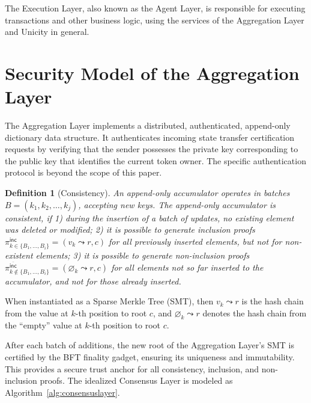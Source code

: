 \documentclass[twocolumn]{article}
\newtheorem{definition}{Definition}
\begin{document}
The Execution Layer, also known as the Agent Layer, is responsible for executing transactions and other business logic, using the services of the Aggregation Layer and Unicity in general.


\section{Security Model of the Aggregation Layer}

The Aggregation Layer implements a distributed, authenticated, append-only dictionary data structure.
It authenticates incoming state transfer certification requests by verifying that the sender possesses the private key corresponding to the public key that identifies the current token owner. The specific authentication protocol is beyond the scope of this paper.

\begin{definition}[Consistency]
An append-only accumulator operates in batches $B = (k_1, k_2, \ldots, k_j)$, accepting new keys. The append-only accumulator is \emph{consistent}, if 1) during the insertion of a batch of updates, no existing element was deleted or modified; 2) it is possible to generate inclusion proofs $\pi^{\textsf{inc}}_{k \in \{B_1, \dots, B_i\}} = (v_k \leadsto r, c)$ for all previously inserted elements, but not for non-existent elements; 3) it is possible to generate non-inclusion proofs $\pi^{\overline{\textsf {inc}}}_{k \notin \{B_1, \dots, B_i\}} = (\varnothing_k \leadsto r, c)$ for all elements not so far inserted to the accumulator, and not for those already inserted.
\label{def:append-only-accumulator}
\end{definition}

When instantiated as a Sparse Merkle Tree (SMT), then $v_k \leadsto r$ is the hash chain from the value at $k$-th position to root $c$, and $\varnothing_k \leadsto r$ denotes the hash chain from the ``empty'' value at $k$-th position to root $c$.

After each batch of additions, the new root of the Aggregation Layer's SMT is certified by the BFT finality gadget, ensuring its uniqueness and immutability. This provides a secure trust anchor for all consistency, inclusion, and non-inclusion proofs. The idealized Consensus Layer is modeled as Algorithm~\ref{alg:consensuslayer}.
\end{document}
